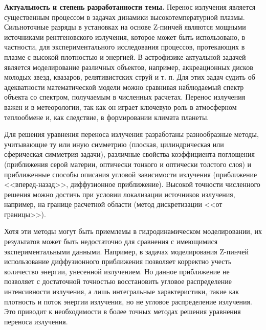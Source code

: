 \newcommand{\actuality}{{\textbf{Актуальность и степень разработанности темы.}}}
\newcommand{\aim}{{\textbf{Целью}}}
\newcommand{\tasks}{{\textbf{задачи}}}
\newcommand{\novelty}{{\textbf{Научная новизна:}}}
\newcommand{\influence}{{\textbf{Теоретическая и практическая значимость}}}
\newcommand{\defpositions}{{\textbf{Основные положения, выносимые на~защиту}}}
\newcommand{\probation}{{\textbf{Степень достоверности и апробация работы.}}}
\newcommand{\methodology}{{\textbf{Методология и методы исследования.}}}

{\actuality} Перенос излучения является существенным процессом в задачах динамики высокотемпературной плазмы. Сильноточные разряды в установках на основе Z-пинчей являются мощными источниками рентгеновского излучения, которое может быть использовано, в частности, для экспериментального исследования процессов, протекающих в плазме с высокой плотностью и энергией. 
В астрофизике актуальной задачей является моделирование различных объектов, например, аккреационных дисков молодых звезд, квазаров, релятивистских струй и т. п.
Для этих задач судить об адекватности математической модели можно сравнивая наблюдаемый спектр объекта со спектром, получаемым в численных расчетах.
Перенос излучения важен и в метеорологии, так как он играет ключевую роль в атмосферном теплообмене и, как следствие, в формировании климата планеты.

Для решения уравнения переноса излучения разработаны разнообразные методы, учитывающие ту или иную симметрию (плоская, цилиндрическая или сферическая симметрия задачи), различные свойства коэффициента поглощения (приближения серой материи, оптически тонкого и оптически толстого слоя) и приближенные способы описания угловой зависимости излучения (приближение <<вперед-назад>>, диффузионное приближение). Высокой точности численного решения можно достичь при условии локализации источников излучения, например, на границе расчетной области (метод дискретизации <<от границы>>). 

Хотя эти методы могут быть приемлемы в гидродинамическом моделировании, их результатов может быть недостаточно для сравнения с имеющимися экспериментальными данными. Например, в задачах моделирования Z-пинчей использование диффузионного приближения позволяет корректно учесть количество энергии, унесенной излучением. Но данное приближение не позволяет с достаточной точностью восстановить угловое распределение интенсивности излучения, а лишь интегральные характеристики, такие как плотность и поток энергии излучения, но не угловое распределение излучения. Это приводит к необходимости в более точных методах решения уравнения переноса излучения.

